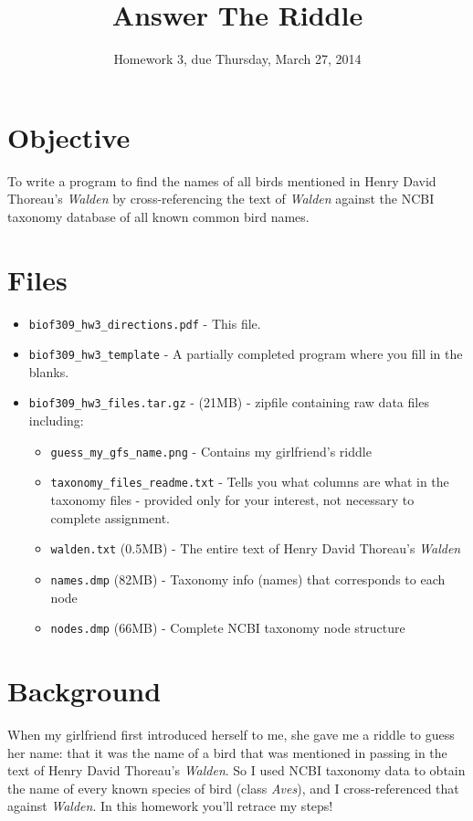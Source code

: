 \documentclass[11pt]{amsart}
\title{Answer The Riddle}
\author{Homework 3, due Thursday, March 27, 2014}
\begin{document}
\maketitle

\section*{Objective}
To write a program to find the names of all birds mentioned in Henry David Thoreau's \textit{Walden} by cross-referencing the text of \textit{Walden} against the NCBI taxonomy database of all known common bird names.

\section*{Files}
\begin{itemize}
  \item \texttt{biof309_hw3_directions.pdf} - This file.
  \item \texttt{biof309_hw3_template} -  A partially completed program where you fill in the blanks.
  \item \texttt{biof309_hw3_files.tar.gz} - (21MB) - zipfile containing raw data files including:
  \begin{itemize}
    \item \texttt{guess_my_gfs_name.png} - Contains my girlfriend's riddle
    \item \texttt{taxonomy_files_readme.txt} - Tells you what columns are what in the taxonomy files - provided only for your interest, not necessary to complete assignment.
    \item \texttt{walden.txt} (0.5MB) - The entire text of Henry David Thoreau's \textit{Walden}
    \item \texttt{names.dmp} (82MB) - Taxonomy info (names) that corresponds to each node
    \item \texttt{nodes.dmp} (66MB) - Complete NCBI taxonomy node structure
  \end{itemize}
\end{itemize}

\section*{Background}
When my girlfriend first introduced herself to me, she gave me a riddle to guess her name: that it was the name of a bird that was mentioned in passing in the text of Henry David Thoreau's \textit{Walden}. So I used NCBI taxonomy data to obtain the name of every known species of bird (class \textit{Aves}), and I cross-referenced that against \textit{Walden}. In this homework you'll retrace my steps!
\end{document}
